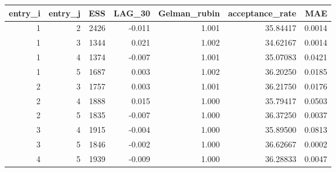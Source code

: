 \begin{longtable}{rrrrrrr}
\toprule
entry\_i & entry\_j & ESS & LAG\_30 & Gelman\_rubin & acceptance\_rate & MAE \\ 
\midrule
1 & 2 & 2426 & -0.011 & 1.001 & 35.84417 & 0.0014 \\ 
1 & 3 & 1344 & 0.021 & 1.002 & 34.62167 & 0.0014 \\ 
1 & 4 & 1374 & -0.007 & 1.001 & 35.07083 & 0.0421 \\ 
1 & 5 & 1687 & 0.003 & 1.002 & 36.20250 & 0.0185 \\ 
2 & 3 & 1757 & 0.003 & 1.001 & 36.21750 & 0.0176 \\ 
2 & 4 & 1888 & 0.015 & 1.000 & 35.79417 & 0.0503 \\ 
2 & 5 & 1835 & -0.007 & 1.000 & 36.37250 & 0.0037 \\ 
3 & 4 & 1915 & -0.004 & 1.000 & 35.89500 & 0.0813 \\ 
3 & 5 & 1846 & -0.002 & 1.000 & 36.62667 & 0.0002 \\ 
4 & 5 & 1939 & -0.009 & 1.000 & 36.28833 & 0.0047 \\ 
\bottomrule
\end{longtable}

